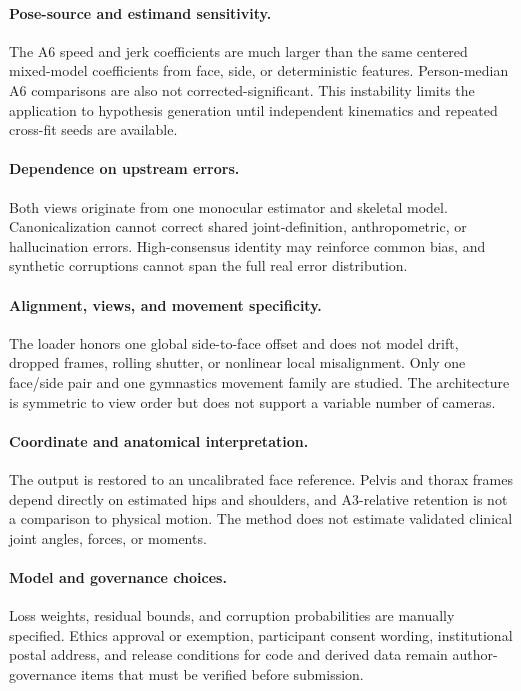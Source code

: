 \paragraph{Pose-source and estimand sensitivity.}
The A6 speed and jerk coefficients are much larger than the same centered
mixed-model coefficients from face, side, or deterministic features.
Person-median A6 comparisons are also not corrected-significant. This
instability limits the application to hypothesis generation until independent
kinematics and repeated cross-fit seeds are available.

\paragraph{Dependence on upstream errors.}
Both views originate from one monocular estimator and skeletal model.
Canonicalization cannot correct shared joint-definition, anthropometric, or
hallucination errors. High-consensus identity may reinforce common bias, and
synthetic corruptions cannot span the full real error distribution.

\paragraph{Alignment, views, and movement specificity.}
The loader honors one global side-to-face offset and does not model drift,
dropped frames, rolling shutter, or nonlinear local misalignment. Only one
face/side pair and one gymnastics movement family are studied. The architecture
is symmetric to view order but does not support a variable number of cameras.

\paragraph{Coordinate and anatomical interpretation.}
The output is restored to an uncalibrated face reference. Pelvis and thorax
frames depend directly on estimated hips and shoulders, and A3-relative
retention is not a comparison to physical motion. The method does not estimate
validated clinical joint angles, forces, or moments.

\paragraph{Model and governance choices.}
Loss weights, residual bounds, and corruption probabilities are manually
specified. Ethics approval or exemption, participant consent wording,
institutional postal address, and release conditions for code and derived data
remain author-governance items that must be verified before submission.
